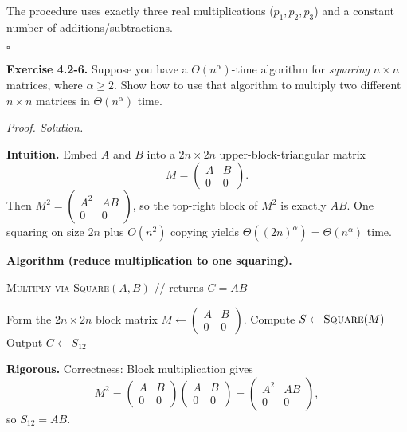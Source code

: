 \documentclass[12pt]{article}
\theoremstyle{definition}
\begin{document}
The procedure uses exactly three real multiplications ($p_1,p_2,p_3$) and a constant number of additions/subtractions.

\hfill$\square$

\newpage

\noindent\textbf{Exercise 4.2-6.}
Suppose you have a $\Theta(n^{\alpha})$-time algorithm for \emph{squaring} $n\times n$ matrices, where $\alpha\ge 2$.
Show how to use that algorithm to multiply two different $n\times n$ matrices in $\Theta(n^{\alpha})$ time.

\medskip
\noindent\textit{Proof. Solution.}

\noindent\textbf{Intuition.}
Embed $A$ and $B$ into a $2n\times 2n$ upper-block-triangular matrix
\[
M=\begin{pmatrix}A & B\\[2pt] 0 & 0\end{pmatrix}.
\]
Then $M^2=\begin{pmatrix}A^2 & AB\\[2pt] 0 & 0\end{pmatrix}$, so the top-right block of $M^2$ is exactly $AB$.
One squaring on size $2n$ plus $O(n^2)$ copying yields $\Theta((2n)^{\alpha})=\Theta(n^{\alpha})$ time.

\noindent\textbf{Algorithm (reduce multiplication to one squaring).}
\begin{algorithm}[H]
\caption{\textsc{Multiply-via-Square}$(A,B)$ \quad // returns $C=AB$}
\begin{algorithmic}[1]
\State Form the $2n\times 2n$ block matrix $M \gets \begin{pmatrix}A & B\\ 0 & 0\end{pmatrix}$.
\State Compute $S \gets \textsc{Square}(M)$ 
\State Output $C \gets S_{12}$ 
\end{algorithmic}
\end{algorithm}

\noindent\textbf{Rigorous.}
Correctness: Block multiplication gives
\[
M^2=\begin{pmatrix}
A & B\\ 0 & 0
\end{pmatrix}
\begin{pmatrix}
A & B\\ 0 & 0
\end{pmatrix}
=
\begin{pmatrix}
A^2 & AB\\ 0 & 0
\end{pmatrix},
\]
so $S_{12}=AB$.
\end{document}
